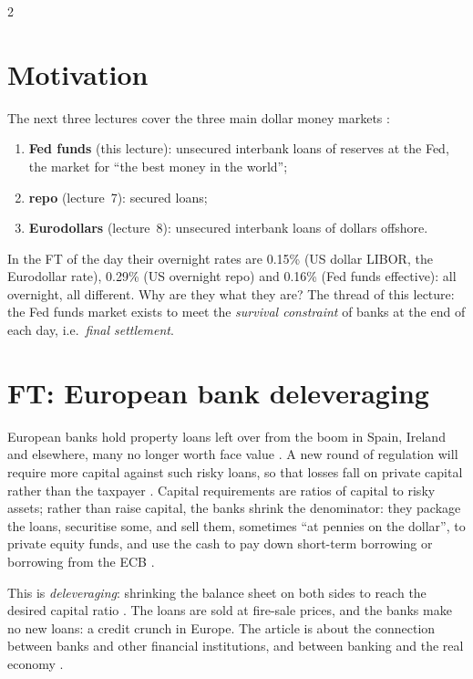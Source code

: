 \begin{paracol}{2}
\section*{Motivation}
The next three lectures cover the three main dollar money markets :
\begin{enumerate}
  \item \textbf{Fed funds} (this lecture): unsecured interbank loans of reserves at the Fed, the market for ``the best money in the world'';
  \item \textbf{repo} (lecture~7): secured loans;
  \item \textbf{Eurodollars} (lecture~8): unsecured interbank loans of dollars offshore.
\end{enumerate}
In the FT of the day their overnight rates are 0.15\% (US dollar LIBOR, the Eurodollar rate), 0.29\% (US overnight repo) and 0.16\% (Fed funds
effective): all overnight, all different. Why are they what they are?  The thread of this lecture: the
Fed funds market exists to meet the \emph{survival constraint} of banks at the end of each day, i.e.\ \emph{final settlement}.

\section{FT: European bank deleveraging}\label{sec:ff-ft-deleveraging}

\begin{casestudy}
European banks hold property loans left over from the boom in Spain, Ireland and elsewhere, many no longer worth face value
. A new round of regulation will require more capital against such risky loans, so that losses fall on private
capital rather than the taxpayer . Capital requirements are ratios of capital to risky assets; rather than raise
capital, the banks shrink the denominator: they package the loans, securitise some, and sell them, sometimes ``at pennies on the dollar'', to
private equity funds, and use the cash to pay down short-term borrowing or borrowing from the ECB .
\end{casestudy}
\begin{taccts}
\qquad
{}
\end{taccts}
This is \emph{deleveraging}: shrinking the balance sheet on both sides to reach the desired capital ratio . The loans are sold at
fire-sale prices, and the banks make no new loans: a credit crunch in Europe. The article is about the connection between banks and other
financial institutions, and between banking and the real economy .


\end{paracol}
